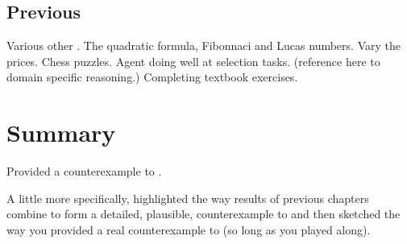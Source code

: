\subsection{Previous }
\label{sec:previous-scen1}


\begin{note}
  Various other .
  The quadratic formula, Fibonnaci and Lucas numbers.
  Vary the prices.
  Chess puzzles.
  Agent doing well at selection tasks. (reference here to domain specific reasoning.)
  Completing textbook exercises.
\end{note}



\section*{Summary}
\label{sec:summary-1}

\begin{note}
  Provided a counterexample to \issueInclusion{}.

  A little more specifically, highlighted the way results of previous chapters combine to form a detailed, plausible, counterexample to \issueConstraint{} and then sketched the way you provided a real counterexample to \issueConstraint{} (so long as you played along).
\end{note}



